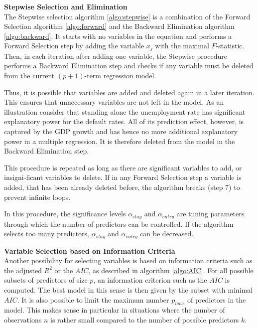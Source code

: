 \documentclass[a4paper, 12pt]{scrreprt}
\begin{document}
\bigskip 
\textbf{Stepwise Selection and Elimination} \\
The Stepwise selection algorithm \ref{algo:stepwise} is a combination of the Forward Selection algorithm \ref{algo:forward} and the Backward Elimination algorithm \ref{algo:backward}.
It starts with no variables in the equation and performs a Forward Selection step by adding the variable $x_j$ with the maximal $F$-statistic. Then, in each iteration after adding one variable, the Stepwise procedure performs a Backward Elimination step and checks if any variable must be deleted from the current $(p+1)$-term regression model.

Thus, it is possible that variables are added and deleted again in a later iteration. This ensures that unnecessary variables are not left in the model. As an illustration consider that standing alone the unemployment rate has significant explanatory power for the default rates. All of its prediction effect, however, is captured by the GDP growth and has hence no more additional explanatory power in a multiple regression. It is therefore deleted from the model in the Backward Elimination step.

This procedure is repeated as long as there are significant variables to add, or insigni-ficant variables to delete. If in any Forward Selection step a variable is added, that has been already deleted before, the algorithm breaks (step 7) to prevent infinite loops.

In this procedure, the significance levels $\alpha_{stay}$ and $\alpha_{entry}$ are tuning parameters through which the number of predictors can be controlled.
If the algorithm selects too many predictors, $\alpha_{stay}$ and $\alpha_{entry}$ can be decreased.


\bigskip 
\textbf{Variable Selection based on Information Criteria} \\
Another possibility for selecting variables is based on information criteria such as the adjusted $R^2$ or the $AIC$, as described in algorithm \ref{algo:AIC}.
For all possible subsets of predictors of size $p$, an information criterion such as the $AIC$ is computed. The best model in this sense is then given by the subset with minimal $AIC$. It is also possible to limit the maximum number $p_{max}$ of predictors in the model. This makes sense in particular in situations where the number of observations $n$ is rather small compared to the number of possible predictors $k$.
\end{document}
